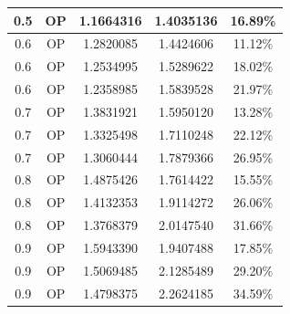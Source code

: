 \documentclass[12pt,a4paper,italian]{article}
\begin{document}
\begin{table}[ht!]
\begin{minipage}[b]{0.48\linewidth}
\begin{tabular}{c c c c c}
			0.5 & OP & 1.1664316 &   1.4035136    & 16.89\% \\ \hline \hline
			0.6 & OP & 1.2820085 &   1.4424606    & 11.12\% \\
			0.6 & OP & 1.2534995 &   1.5289622    & 18.02\% \\
			0.6 & OP & 1.2358985 &   1.5839528    & 21.97\% \\ \hline \hline
			0.7 & OP & 1.3831921 &   1.5950120    & 13.28\% \\
			0.7 & OP & 1.3325498 &   1.7110248    & 22.12\% \\
			0.7 & OP & 1.3060444 &   1.7879366    & 26.95\% \\ \hline \hline
			0.8 & OP & 1.4875426 &   1.7614422    & 15.55\% \\
			0.8 & OP & 1.4132353 &   1.9114272    & 26.06\% \\
			0.8 & OP & 1.3768379 &   2.0147540    & 31.66\% \\ \hline \hline
			0.9 & OP & 1.5943390 &   1.9407488    & 17.85\% \\
			0.9 & OP & 1.5069485 &   2.1285489    & 29.20\% \\
			0.9 & OP & 1.4798375 &   2.2624185    & 34.59\% \\\hline
			

\end{tabular}
\end{minipage}
\end{table}
\end{document}
